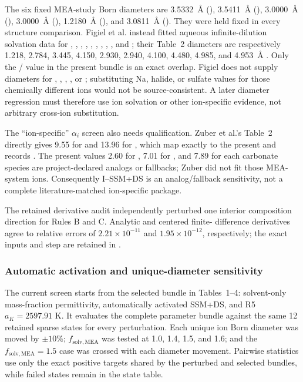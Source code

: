 \documentclass[10pt,oneside]{scrartcl}
\begin{document}
The six fixed MEA-study Born diameters are
\SI{3.5332}{\angstrom} (), \SI{3.5411}{\angstrom}
(), \SI{3.0000}{\angstrom} (),
\SI{3.0000}{\angstrom} (), \SI{1.2180}{\angstrom}
(), and \SI{3.0811}{\angstrom} (). They were held fixed in
every structure comparison. Figiel et al. instead fitted aqueous
infinite-dilution solvation data for , , , ,
, , , , , and ; their
Table~2 diameters are respectively 1.218, 2.784, 3.445, 4.150, 2.930, 2.940,
4.100, 4.480, 4.985, and \SI{4.953}{\angstrom} \cite{Figiel2025}. Only the
/ value in the present bundle is an exact overlap. Figiel
does not supply diameters for , , ,
, or ; substituting Na, halide, or sulfate values for those
chemically different ions would not be source-consistent. A later diameter
regression must therefore use ion solvation or other ion-specific evidence,
not arbitrary cross-ion substitution.

The ``ion-specific'' $\alpha_i$ screen also needs qualification. Zuber
et al.'s Table~2 directly gives 9.55 for  and 13.96 for , which
map exactly to the present  and  records
\cite{Zuber2014}. The present values 2.60 for , 7.01 for
, and 7.89 for each carbonate species are project-declared
analogs or fallbacks; Zuber did not fit those MEA-system ions. Consequently
I--SSM+DS is an analog/fallback sensitivity, not a complete
literature-matched ion-specific package.

The retained derivative audit independently perturbed one interior
composition direction for Rules B and C. Analytic and centered finite-
difference derivatives agree to relative errors of
$2.21\times10^{-11}$ and $1.95\times10^{-12}$, respectively; the exact
inputs and step are retained in
.

\subsubsection{Automatic activation and unique-diameter sensitivity}

The current screen starts from the selected bundle in Tables~1--4: solvent-only
mass-fraction permittivity, automatically activated SSM+DS, and R5
$a_K=2597.91$ K. It evaluates the complete parameter bundle against the same
12 retained sparse states for every perturbation. Each unique ion Born
diameter was moved by $\pm10\%$; $f_{\mathrm{solv},\mathrm{MEA}}$ was tested
at 1.0, 1.4, 1.5, and 1.6; and the $f_{\mathrm{solv},\mathrm{MEA}}=1.5$
case was crossed with each diameter movement. Pairwise statistics use only
the exact positive targets shared by the perturbed and selected bundles, while
failed states remain in the state table.
\end{document}
